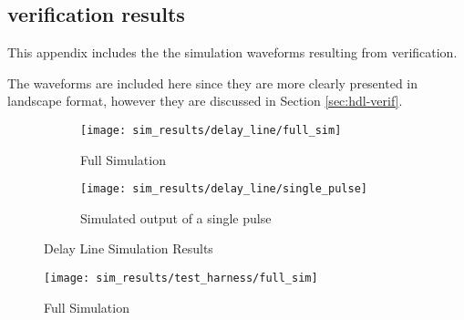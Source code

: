 \begin{appendices}
	
	


\chapter{ verification results} \label{app:sim-wfms}
This appendix includes the the simulation waveforms resulting from verification.

The waveforms are included here since they are more clearly presented in landscape format, however they are discussed in Section \ref{sec:hdl-verif}.


\begin{landscape}

\begin{figure}[ht]
	\centering
	
	\begin{subfigure}[b]{\linewidth}
		\centering
		\texttt{[image: sim\_results/delay\_line/full\_sim]}
		\caption{Full Simulation}
		\label{fig:delay-sim-full}
	\end{subfigure}
	
	\begin{subfigure}[b]{\linewidth}
		\centering
		\texttt{[image: sim\_results/delay\_line/single\_pulse]}
		\caption{Simulated output of a single pulse}
		\label{fig:delay-sim-single}
	\end{subfigure}
	
	\caption{Delay Line Simulation Results}
	\label{fig:delay-sim}
\end{figure}

 \begin{figure}[ht]
	\centering
	\texttt{[image: sim\_results/test\_harness/full\_sim]}
	\caption{Full Simulation}
	\label{fig:harness-full}
\end{figure}

\end{landscape}

\end{appendices}